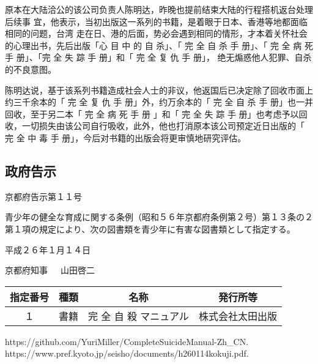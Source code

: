 \documentclass[UTF8]{ctexart}
\begin{document}
原本在大陆洽公的该公司负责人陈明达，昨晚也提前结束大陆的行程搭机返台处理后续事 宜，他表示，当初出版这一系列的书籍，是着眼于日本、香港等地都面临相同的问题，台湾 走在日、港的后面，势必会遇到相同的情形，才本着关怀社会的心理出书，先后出版「心
目%
中%
的%
自%
杀」、「
完%
全%
自%
杀%
手%
册」、「
完%
全%
病%
死%
手%
册」、「完
全%
失%
踪%
手%
册」和「
完%
全%
复%
仇%
手%
册」， 绝无煽惑他人犯罪、自杀的不良意图。

陈明达说，基于该系列书籍造成社会人士的非议，他返国后已决定除了回收市面上约三千余本的「
完%
全%
复%
仇%
手%
册」外，约万余本的「
完%
全%
自%
杀%
手%
册」也一并回收，至于另二本「
完%
全%
病%
死%
手%
册%
」和「
完%
全%
失%
踪%
手%
册」也考虑予以回收，一切损失由该公司自行吸收，此外，他也打消原本该公司预定近日出版的「
完%
全%
中%
毒%
手%
册」，今后对书籍的出版会将更审慎地研究评估。

\subsection*{政府告示\cite{ref2}}

京都府告示第１１号

青少年の健全な育成に関する条例（昭和５６年京都府条例第２号）第１３条の２第１項の規定により、次の図書類を青少年に有害な図書類として指定する。

平成２６年１月１４日

京都府知事\ \ \ 山田啓二

\begin{table}[htbp]
\begin{center}
\begin{tabular}{cccc}

\toprule
指定番号 & 種類 & 名称 & 発行所等 \\
\midrule
１ & 書籍 & 完%
全%
自%
殺%
マニュアル & 株式会社太田出版 \\
\bottomrule
\end{tabular}
\end{center}
\end{table}

\newpage


\begin{thebibliography}{99}  
https://github.com/YuriMiller/CompleteSuicideManual-Zh\_CN.  
https://www.pref.kyoto.jp/seisho/documents/h260114kokuji.pdf.  
\end{thebibliography}
\end{document}
